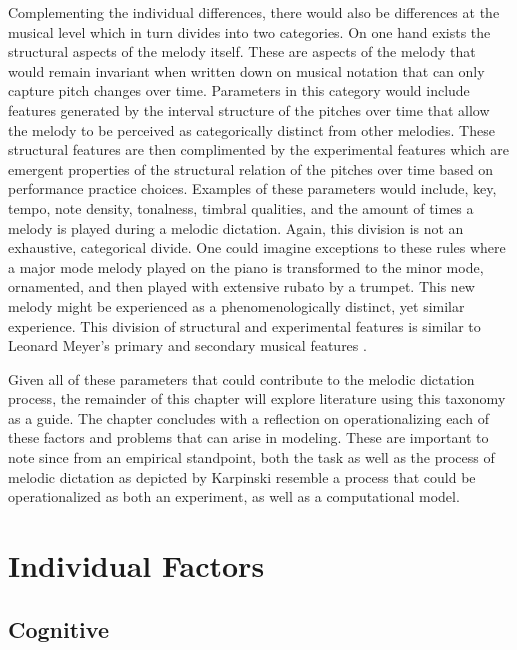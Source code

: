 \documentclass[12pt,]{book}
\begin{document}
Complementing the individual differences, there would also be differences at the musical level which in turn divides into two categories.
On one hand exists the structural aspects of the melody itself.
These are aspects of the melody that would remain invariant when written down on musical notation that can only capture pitch changes over time.
Parameters in this category would include features generated by the interval structure of the pitches over time that allow the melody to be perceived as categorically distinct from other melodies.
These structural features are then complimented by the experimental features which are emergent properties of the structural relation of the pitches over time based on performance practice choices.
Examples of these parameters would include, key, tempo, note density, tonalness, timbral qualities, and the amount of times a melody is played during a melodic dictation.
Again, this division is not an exhaustive, categorical divide.
One could imagine exceptions to these rules where a major mode melody played on the piano is transformed to the minor mode, ornamented, and then played with extensive rubato by a trumpet.
This new melody might be experienced as a phenomenologically distinct, yet similar experience.
This division of structural and experimental features is similar to Leonard Meyer's primary and secondary musical features \citep{meyerEmotionMeaningMusic1956}.

Given all of these parameters that could contribute to the melodic dictation process, the remainder of this chapter will explore literature using this taxonomy as a guide.
The chapter concludes with a reflection on operationalizing each of these factors and problems that can arise in modeling.
These are important to note since from an empirical standpoint, both the task as well as the process of melodic dictation as depicted by Karpinski resemble a process that could be operationalized as both an experiment, as well as a computational model.

\hypertarget{individual-factors}{%
\section{Individual Factors}\label{individual-factors}}

\hypertarget{cognitive}{%
\subsection{Cognitive}\label{cognitive}}
\end{document}
